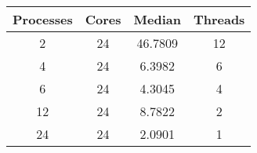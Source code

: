 \begin{tabular}{cccc}
\hline
Processes& Cores& Median& Threads\\
\hline
2& 24& 46.7809& 12\\
4& 24& 6.3982& 6\\
6& 24& 4.3045& 4\\
12& 24& 8.7822& 2\\
24& 24& 2.0901& 1\\
\hline
\end{tabular}

